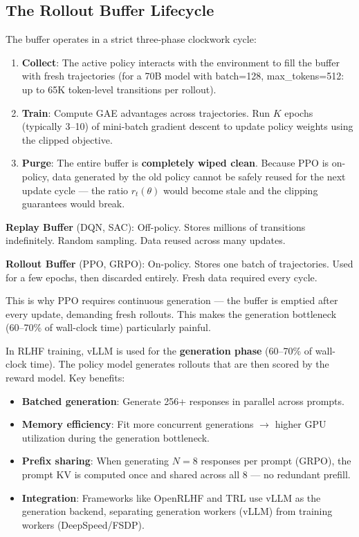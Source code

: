 \subsection{The Rollout Buffer Lifecycle}
\label{the-rollout-buffer-lifecycle}

The buffer operates in a strict three-phase clockwork cycle:

\begin{enumerate}
  \item \textbf{Collect}: The active policy interacts with the environment to fill the buffer with fresh trajectories (for a 70B model with batch=128, max\_tokens=512: up to 65K token-level transitions per rollout).
  \item \textbf{Train}: Compute GAE advantages across trajectories. Run $K$ epochs (typically 3--10) of mini-batch gradient descent to update policy weights using the clipped objective.
  \item \textbf{Purge}: The entire buffer is \textbf{completely wiped clean}. Because PPO is on-policy, data generated by the old policy cannot be safely reused for the next update cycle --- the ratio $r_t(\theta)$ would become stale and the clipping guarantees would break.
\end{enumerate}

\begin{warningbox}
\textbf{Replay Buffer} (DQN, SAC): Off-policy. Stores millions of transitions indefinitely. Random sampling. Data reused across many updates.

\textbf{Rollout Buffer} (PPO, GRPO): On-policy. Stores one batch of trajectories. Used for a few epochs, then discarded entirely. Fresh data required every cycle.

This is why PPO requires continuous generation --- the buffer is emptied after every update, demanding fresh rollouts. This makes the generation bottleneck (60--70\% of wall-clock time) particularly painful.
\end{warningbox}

\begin{intuitionbox}
In RLHF training, vLLM is used for the \textbf{generation phase} (60--70\% of wall-clock time). The policy model generates rollouts that are then scored by the reward model. Key benefits:

\begin{itemize}
  \item \textbf{Batched generation}: Generate 256+ responses in parallel across prompts.
  \item \textbf{Memory efficiency}: Fit more concurrent generations $\rightarrow$ higher GPU utilization during the generation bottleneck.
  \item \textbf{Prefix sharing}: When generating $N=8$ responses per prompt (GRPO), the prompt KV is computed once and shared across all 8 --- no redundant prefill.
  \item \textbf{Integration}: Frameworks like OpenRLHF and TRL use vLLM as the generation backend, separating generation workers (vLLM) from training workers (DeepSpeed/FSDP).
\end{itemize}
\end{intuitionbox}

